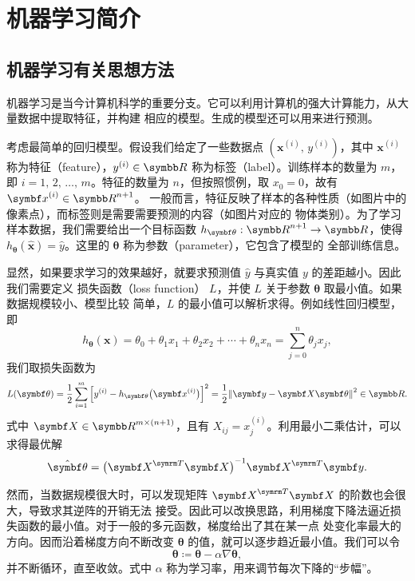 \chapter{机器学习简介}

\section{机器学习有关思想方法}

机器学习是当今计算机科学的重要分支。它可以利用计算机的强大计算能力，从大量数据中提取特征，并构建
相应的模型。生成的模型还可以用来进行预测。

考虑最简单的回归模型。假设我们给定了一些数据点 $(\bm{x}^{(i)}, \, y^{(i)})$，其中 $\bm{x}^{(i)}$
称为特征（feature），$y^{(i)}\in\R$ 称为标签（label）。训练样本的数量为 $m$，即
$i=1,\,2,\,\ldots,\,m$。特征的数量为 $n$，但按照惯例，取 $x_0=0$，故有 $\bm{x}^{(i)}\in\R^{n+1}$。
一般而言，特征反映了样本的各种性质（如图片中的像素点），而标签则是需要需要预测的内容（如图片对应的
物体类别）。为了学习样本数据，我们需要给出一个目标函数 $h_\bm{\theta}: \R^{n+1}\to\R$，使得
$h_\bm{\theta}(\hat{\bm{x}})=\hat{y}$。这里的 $\bm{\theta}$ 称为参数（parameter），它包含了模型的
全部训练信息。

显然，如果要求学习的效果越好，就要求预测值 $\hat{y}$ 与真实值 $y$ 的差距越小。因此我们需要定义
损失函数（loss function） $L$，并使 $L$ 关于参数 $\bm{\theta}$ 取最小值。如果数据规模较小、模型比较
简单，$L$ 的最小值可以解析求得。例如线性回归模型，即
\begin{equation}
  h_\bm{\theta} (\bm{x})
  = \theta_0 + \theta_1 x_1 + \theta_2 x_2 + \cdots + \theta_n x_n
  = \sum_{j=0}^n \theta_j x_j,
\end{equation}
我们取损失函数为
\begin{equation}
  L(\bm{\theta})
  = \frac{1}{2} \sum_{i=1}^m \qty\Big[y^{(i)} - h_\bm{\theta}\qty\big(\bm{x}^{(i)})]^2
  = \frac{1}{2} \norm{\bm{y} - \bm{X}\bm{\theta}}^2 \in \R.
\end{equation}
式中 $\bm{X}\in\R^{m\times(n+1)}$，且有 $X_{ij} = x^{(i)}_j$。利用最小二乘估计，可以求得最优解
\begin{equation}
  \hat{\bm{\theta}} = \qty\big(\bm{X}^\trans\bm{X})^{-1} \bm{X}^\trans \bm{y}.
\end{equation}

然而，当数据规模很大时，可以发现矩阵 $\bm{X}^\trans\bm{X}$ 的阶数也会很大，导致求其逆阵的开销无法
接受。因此可以改换思路，利用梯度下降法逼近损失函数的最小值。对于一般的多元函数，梯度给出了其在某一点
处变化率最大的方向。因而沿着梯度方向不断改变 $\bm{\theta}$ 的值，就可以逐步趋近最小值。我们可以令
\begin{equation}
  \bm{\theta} \coloneq \bm{\theta} - \alpha\nabla\bm{\theta},
\end{equation}
并不断循环，直至收敛。式中 $\alpha$ 称为学习率，用来调节每次下降的“步幅”。


